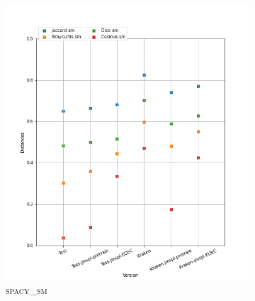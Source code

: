 \begin{figure}
\begin{minipage}{6cm}
\begin{subfigure}{0.89\textwidth}
  \label{fig:TROLLOPE-graph-dist-stanza }
  \end{subfigure}
  \end{minipage}
  \begin{minipage}{6cm}
  \begin{subfigure}{0.89\textwidth}
  \includegraphics[width=.89\textwidth]{IMAGES/ELTeC_DISTANCES_spaCy3.5.1/TROLLOPE-graph-dist-spaCy3.5.1-sm.png} 
  \caption{\textsc{spacy\_sm}}
  \label{fig:TROLLOPE-graph-dist-spaCy3.5.1-sm}
  \end{subfigure}
    \end{minipage}
  \begin{minipage}{6cm}
  \begin{subfigure}{0.89\textwidth}

\end{subfigure}
\end{minipage}
\end{figure}
